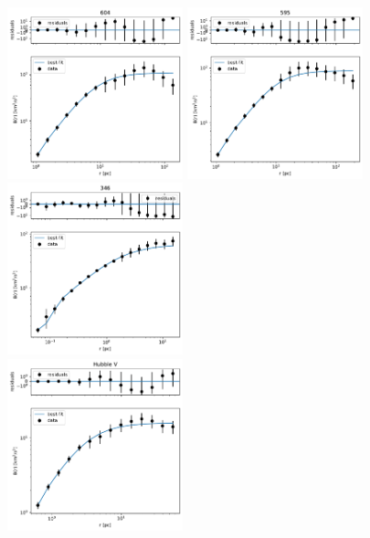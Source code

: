 \documentclass[fleqn,usenatbib, useAMS, a4paper]{mnras}
\begin{document}
\begin{figure}
\centering
\begin{multicols}{3}
\includegraphics[width=2in]{Figures/SFplots/604.pdf}\par
\includegraphics[width=2in]{Figures/SFplots/595.pdf}\par
\includegraphics[width=2in]{Figures/SFplots/346.pdf}\par
\end{multicols}
\begin{multicols}{3}
\includegraphics[width=2in]{Figures/SFplots/Hubble V.pdf}\par

\end{multicols}
\end{figure}
\end{document}

